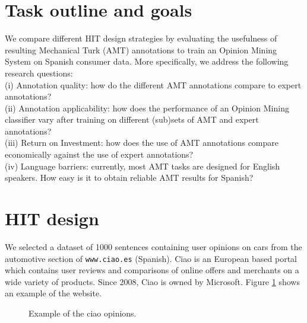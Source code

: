 \documentclass[11pt, a4paper,onecolumn]{article}
\begin{document}
\section{Task outline and goals}
\label{sect:outline} 

We compare different HIT design strategies by evaluating the usefulness of resulting Mechanical Turk (AMT) annotations to train an Opinion Mining System on Spanish consumer data. More specifically, we address the following research questions:\\
 \indent (i) Annotation quality: how do the different AMT annotations compare to expert annotations?\\
 \indent (ii) Annotation applicability: how does the performance of an Opinion Mining classifier vary after training on different (sub)sets of AMT and expert annotations?\\
 \indent (iii) Return on Investment: how does the use of AMT annotations compare economically against the use of expert annotations?\\
 \indent (iv) Language barriers: currently, most AMT tasks are designed for English speakers. How easy is it to obtain reliable AMT results for Spanish? 

\section{HIT design}
\label{sect:design}

We selected a dataset of 1000 sentences containing user opinions on cars from the automotive section of \texttt{www.ciao.es} (Spanish). Ciao is an European based portal which contains user reviews and comparisons of online offers and merchants on a wide variety of products. Since 2008, Ciao is owned by Microsoft. Figure \ref{ciao} shows an example of the website. 
 


\begin{figure}[ht]
  \begin{center}
	\caption{Example of the ciao opinions.}
	\label{ciao}
  \end{center}
\end{figure}
\end{document}
